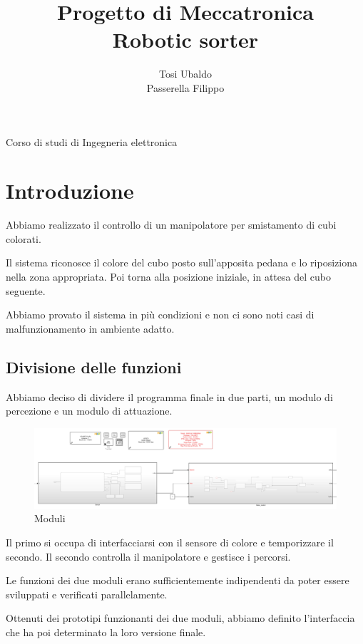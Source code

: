 \documentclass[12pt]{report}
\title{{Progetto di Meccatronica}\\{Robotic sorter}}
\author{{Tosi Ubaldo}\\{Passerella Filippo}}
\begin{document}
\maketitle
\begin{center}
    Corso di studi di Ingegneria elettronica
\end{center}

\newpage
\tableofcontents

\chapter{Introduzione}

Abbiamo realizzato il controllo di un manipolatore per smistamento di cubi colorati.

Il sistema riconosce il colore del cubo posto sull'apposita pedana e lo riposiziona nella zona appropriata. Poi torna alla posizione iniziale, in attesa del cubo seguente.

Abbiamo provato il sistema in più condizioni e non ci sono noti casi di malfunzionamento in ambiente adatto.

\section{Divisione delle funzioni}

Abbiamo deciso di dividere il programma finale in due parti, un modulo di percezione e un modulo di attuazione.

\begin{figure}
\includegraphics[width=\textwidth]{Modules}
\caption{Moduli}
\end{figure}

Il primo si occupa di interfacciarsi con il sensore di colore e temporizzare il secondo. Il secondo controlla il manipolatore e gestisce i percorsi.

Le funzioni dei due moduli erano sufficientemente indipendenti da poter essere sviluppati e verificati parallelamente.

Ottenuti dei prototipi funzionanti dei due moduli, abbiamo definito l'interfaccia che ha poi determinato la loro versione finale.
\end{document}
